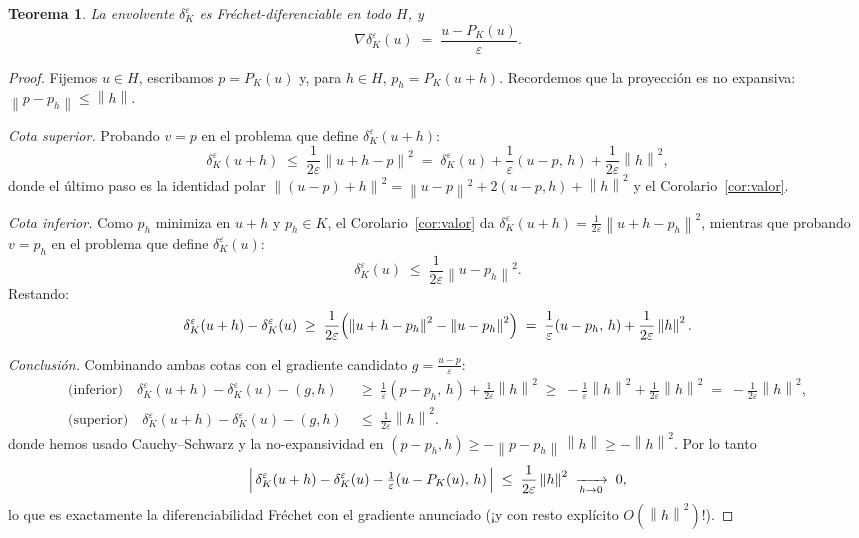 \documentclass[11pt,a4paper]{article}
\newtheorem{teorema}{Teorema}[section]
\theoremstyle{definition}
\theoremstyle{remark}
\newcommand{\Norm}[1]{\left\lVert #1 \right\rVert}
\newcommand{\dke}{\delta_K^\varepsilon}
\newcommand{\pk}{P_K}
\begin{document}
\begin{teorema}\label{thm:diferenciable}
La envolvente $\dke$ es Fréchet-diferenciable en todo $H$, y
\[
\nabla \dke(u) \;=\; \frac{u - \pk(u)}{\varepsilon}.
\]
\end{teorema}

\begin{proof}
Fijemos $u \in H$, escribamos $p = \pk(u)$ y, para $h \in H$,
$p_h = \pk(u + h)$. Recordemos que la proyección es no expansiva:
$\Norm{p - p_h} \le \Norm{h}$.

\smallskip
\emph{Cota superior.} Probando $v = p$ en el problema que define
$\dke(u+h)$:
\[
\dke(u+h) \;\le\; \frac{1}{2\varepsilon}\Norm{u + h - p}^2
\;=\; \dke(u) + \frac{1}{\varepsilon}(u - p,\, h) + \frac{1}{2\varepsilon}\Norm{h}^2 ,
\]
donde el último paso es la identidad polar
$\Norm{(u-p)+h}^2 = \Norm{u-p}^2 + 2(u-p,h) + \Norm{h}^2$ y el
Corolario~\ref{cor:valor}.

\smallskip
\emph{Cota inferior.} Como $p_h$ minimiza en $u + h$ y $p_h \in K$, el
Corolario~\ref{cor:valor} da
$\dke(u+h) = \frac{1}{2\varepsilon}\Norm{u + h - p_h}^2$, mientras que
probando $v = p_h$ en el problema que define $\dke(u)$:
\[
\dke(u) \;\le\; \frac{1}{2\varepsilon}\Norm{u - p_h}^2 .
\]
Restando:
\[
\dke(u+h) - \dke(u)
\;\ge\; \frac{1}{2\varepsilon}\Bigl(\Norm{u + h - p_h}^2 - \Norm{u - p_h}^2\Bigr)
\;=\; \frac{1}{\varepsilon}(u - p_h,\, h) + \frac{1}{2\varepsilon}\Norm{h}^2 .
\]

\smallskip
\emph{Conclusión.} Combinando ambas cotas con el gradiente candidato
$g = \frac{u - p}{\varepsilon}$:
\begin{align*}
\text{(inferior)}\quad
\dke(u+h) - \dke(u) - (g, h)
&\;\ge\; \frac{1}{\varepsilon}(p - p_h,\, h) + \frac{1}{2\varepsilon}\Norm{h}^2
\;\ge\; -\frac{1}{\varepsilon}\Norm{h}^2 + \frac{1}{2\varepsilon}\Norm{h}^2
\;=\; -\frac{1}{2\varepsilon}\Norm{h}^2,\\[1mm]
\text{(superior)}\quad
\dke(u+h) - \dke(u) - (g, h)
&\;\le\; \frac{1}{2\varepsilon}\Norm{h}^2 .
\end{align*}
donde hemos usado Cauchy--Schwarz y la no-expansividad en
$(p - p_h, h) \ge -\Norm{p-p_h}\,\Norm{h} \ge -\Norm{h}^2$. Por lo tanto
\[
\Bigl|\, \dke(u+h) - \dke(u) - \tfrac{1}{\varepsilon}(u - \pk(u),\, h) \,\Bigr|
\;\le\; \frac{1}{2\varepsilon}\Norm{h}^2 \;\xrightarrow[h \to 0]{}\; 0 ,
\]
lo que es exactamente la diferenciabilidad Fréchet con el gradiente
anunciado (¡y con resto explícito $O(\Norm{h}^2)$!).
\end{proof}
\end{document}

